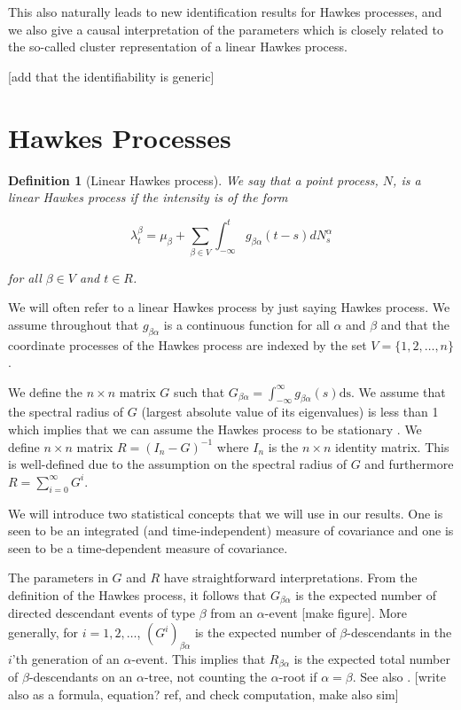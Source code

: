 \documentclass[accepted]{uai2021} %
\newtheorem{defn}[thm]{Definition}
\newcommand{\ds}{\text{ds}}
\begin{document}
This also naturally leads to new identification results for Hawkes processes, 
and we also give a causal interpretation of the parameters which is closely 
related to the so-called cluster representation of a linear Hawkes process.

[add that the identifiability is generic]



\section{Hawkes Processes}
\label{sec:hawPro}

\begin{defn}[Linear Hawkes process]
	We say that a point process, $N$, is a \emph{linear Hawkes process} if the 
	intensity is of the form
	
	$$
	\lambda_t^\beta = \mu_\beta + \sum_{\beta \in V} \int_{-\infty}^{t} 
	g_{\beta\alpha}(t - s) d 
	N_s^\alpha
	$$
	
	\noindent for all $\beta\in V$ and $t\in R$. 
	\label{def:hawProc}
\end{defn}

We will often refer to a linear Hawkes process by just saying Hawkes process. 
We assume throughout that $g_{\beta\alpha}$ is a continuous function for all 
$\alpha$ and $\beta$ and that the coordinate processes of the Hawkes 
process are indexed by the set $V = \{1,2,\ldots, n\}$.

We define the $n\times n$ matrix $G$ such that $G_{\beta\alpha} = 
\int_{-\infty}^\infty 
g_{\beta\alpha}(s) \ds$. We assume that the spectral radius of $G$ (largest 
absolute value of its eigenvalues) is less than 1 which implies that we can 
assume the Hawkes process to be stationary \citep{jovanovic2015}.
We define $n\times n$ matrix $R=(I_n - G)^{-1}$ where $I_n$ is the 
$n\times n$ identity matrix. This is well-defined due to the assumption on 
the spectral radius of $G$ and furthermore $R = \sum_{i=0}^\infty G^i$. 

We will introduce two statistical concepts that we will use in our results. One 
is seen to be an integrated (and time-independent) measure of covariance and 
one is seen to be a 
time-dependent measure of covariance.

The parameters in $G$ and $R$ have straightforward interpretations. From the 
definition of the Hawkes process, it follows that $G_{\beta\alpha}$ is the 
expected number of directed descendant events of type $\beta$ from an 
$\alpha$-event [make figure]. More generally, for $i = 1,2,\ldots$, 
$(G^i)_{\beta\alpha}$ is the 
expected number of $\beta$-descendants in the $i$'th generation of an 
$\alpha$-event. This implies that $R_{\beta\alpha}$ is the expected total 
number of $\beta$-descendants on an $\alpha$-tree, not counting the 
$\alpha$-root if $\alpha=\beta$. 
See also 
\cite{jovanovic2015}.
[write also as a formula, 
equation? ref, and check computation, make also sim]
\end{document}
